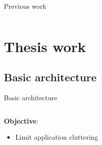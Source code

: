 \documentclass[aspectratio=169]{beamer}
\begin{document}
\begin{frame}{Previous work}
\begin{columns}[c]
\begin{column}{.5\textwidth}
\begin{center}
			\end{center}
		\end{column}
	\end{columns}
\end{frame}

\section{Thesis work}
\subsection{Basic architecture}
\begin{frame}{Basic architecture}
	\begin{columns}[c]
		\begin{column}{.55\textwidth}
			\textbf{Objective}:
			\begin{itemize}
				\item Limit application cluttering
			\end{itemize}


\end{column}
\end{columns}
\end{frame}
\end{document}

